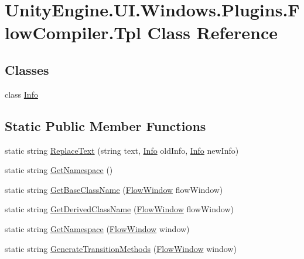 \hypertarget{class_unity_engine_1_1_u_i_1_1_windows_1_1_plugins_1_1_flow_compiler_1_1_tpl}{}\section{Unity\+Engine.\+U\+I.\+Windows.\+Plugins.\+Flow\+Compiler.\+Tpl Class Reference}
\label{class_unity_engine_1_1_u_i_1_1_windows_1_1_plugins_1_1_flow_compiler_1_1_tpl}
\subsection*{Classes}
\begin{DoxyCompactItemize}
\item 
class \hyperlink{class_unity_engine_1_1_u_i_1_1_windows_1_1_plugins_1_1_flow_compiler_1_1_tpl_1_1_info}{Info}
\end{DoxyCompactItemize}
\subsection*{Static Public Member Functions}
\begin{DoxyCompactItemize}
\item 
static string \hyperlink{class_unity_engine_1_1_u_i_1_1_windows_1_1_plugins_1_1_flow_compiler_1_1_tpl_a8adf6d56a8dda9af20a5151d1502399e}{Replace\+Text} (string text, \hyperlink{class_unity_engine_1_1_u_i_1_1_windows_1_1_plugins_1_1_flow_compiler_1_1_tpl_1_1_info}{Info} old\+Info, \hyperlink{class_unity_engine_1_1_u_i_1_1_windows_1_1_plugins_1_1_flow_compiler_1_1_tpl_1_1_info}{Info} new\+Info)
\item 
static string \hyperlink{class_unity_engine_1_1_u_i_1_1_windows_1_1_plugins_1_1_flow_compiler_1_1_tpl_af0808150a1bd58c7b21eaa06559644d2}{Get\+Namespace} ()
\item 
static string \hyperlink{class_unity_engine_1_1_u_i_1_1_windows_1_1_plugins_1_1_flow_compiler_1_1_tpl_abe6bb642d159d949ca437537223d9fa3}{Get\+Base\+Class\+Name} (\hyperlink{class_unity_engine_1_1_u_i_1_1_windows_1_1_plugins_1_1_flow_1_1_flow_window}{Flow\+Window} flow\+Window)
\item 
static string \hyperlink{class_unity_engine_1_1_u_i_1_1_windows_1_1_plugins_1_1_flow_compiler_1_1_tpl_aebca91e42463055099a5b466b0864606}{Get\+Derived\+Class\+Name} (\hyperlink{class_unity_engine_1_1_u_i_1_1_windows_1_1_plugins_1_1_flow_1_1_flow_window}{Flow\+Window} flow\+Window)
\item 
static string \hyperlink{class_unity_engine_1_1_u_i_1_1_windows_1_1_plugins_1_1_flow_compiler_1_1_tpl_a3bca63f0d4e4335d41967aa4a7a20f00}{Get\+Namespace} (\hyperlink{class_unity_engine_1_1_u_i_1_1_windows_1_1_plugins_1_1_flow_1_1_flow_window}{Flow\+Window} window)
\item 
static string \hyperlink{class_unity_engine_1_1_u_i_1_1_windows_1_1_plugins_1_1_flow_compiler_1_1_tpl_a62471a9ad21a570fa6c2c40e30acb88c}{Generate\+Transition\+Methods} (\hyperlink{class_unity_engine_1_1_u_i_1_1_windows_1_1_plugins_1_1_flow_1_1_flow_window}{Flow\+Window} window)
\end{DoxyCompactItemize}


